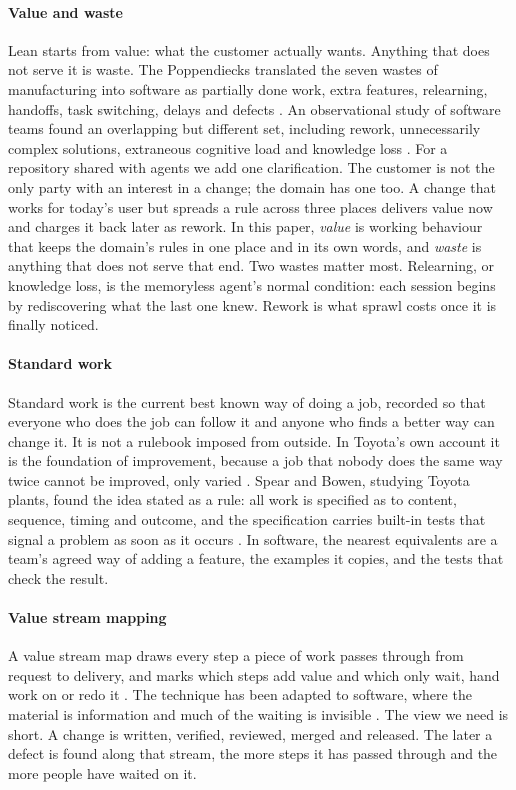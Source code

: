 \paragraph{Value and waste} Lean starts from value: what the customer actually wants. Anything that
does not serve it is waste. The Poppendiecks translated the seven wastes of manufacturing into
software as partially done work, extra features, relearning, handoffs, task switching, delays and
defects \citep{poppendieck2006implementing}. An observational study of software teams found an
overlapping but different set, including rework, unnecessarily complex solutions, extraneous
cognitive load and knowledge loss \citep{sedano2017waste}. For a repository shared with agents we
add one clarification. The customer is not the only party with an interest in a change; the
domain has one too. A change that works for today's user but spreads a rule across three places
delivers value now and charges it back later as rework. In this paper, \emph{value} is working
behaviour that keeps the domain's rules in one place and in its own words, and \emph{waste} is
anything that does not serve that end. Two wastes matter most. Relearning, or knowledge loss, is
the memoryless agent's normal condition: each session begins by rediscovering what the last one
knew. Rework is what sprawl costs once it is finally noticed.

\paragraph{Standard work} Standard work is the current best known way of doing a job, recorded so
that everyone who does the job can follow it and anyone who finds a better way can change it. It
is not a rulebook imposed from outside. In Toyota's own account it is the foundation of
improvement, because a job that nobody does the same way twice cannot be improved, only varied
\citep{liker2004toyota}. Spear and Bowen, studying Toyota plants, found the idea stated as a rule:
all work is specified as to content, sequence, timing and outcome, and the specification carries
built-in tests that signal a problem as soon as it occurs \citep{spear1999decoding}. In software,
the nearest equivalents are a team's agreed way of adding a feature, the examples it copies, and
the tests that check the result.

\paragraph{Value stream mapping} A value stream map draws every step a piece of work passes
through from request to delivery, and marks which steps add value and which only wait, hand work
on or redo it \citep{rother1999learning}. The technique has been adapted to software, where the
material is information and much of the waiting is invisible
\citep{poppendieck2003lean,khurum2014extending,ali2016flow}. The view we need is short. A change is
written, verified, reviewed, merged and released. The later a defect is found along that stream,
the more steps it has passed through and the more people have waited on it.

